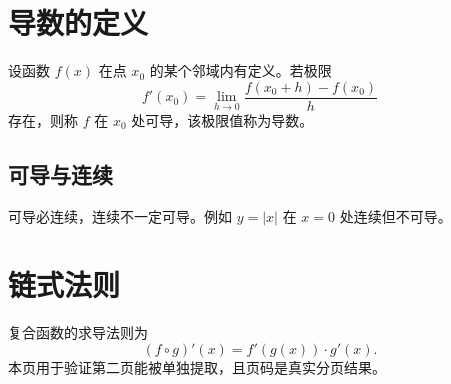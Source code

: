 ﻿\documentclass[11pt]{ctexart}
\begin{document}
\section{导数的定义}
设函数 $f(x)$ 在点 $x_0$ 的某个邻域内有定义。若极限
\[ f'(x_0)=\lim_{h\to 0}\frac{f(x_0+h)-f(x_0)}{h} \]
存在，则称 $f$ 在 $x_0$ 处可导，该极限值称为导数。

\subsection{可导与连续}
可导必连续，连续不一定可导。例如 $y=|x|$ 在 $x=0$ 处连续但不可导。

\newpage
\section{链式法则}
复合函数的求导法则为
\[ (f\circ g)'(x)=f'(g(x))\cdot g'(x). \]
本页用于验证第二页能被单独提取，且页码是真实分页结果。
\end{document}
